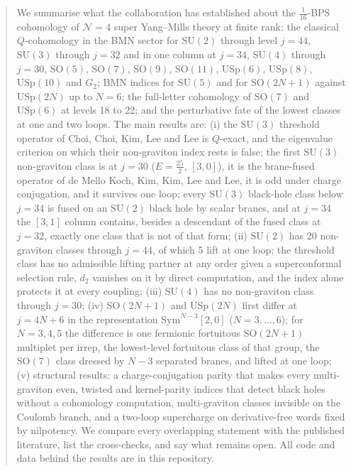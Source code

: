 \documentclass[11pt]{article}
\newcommand{\SU}{\mathrm{SU}}
\newcommand{\SO}{\mathrm{SO}}
\newcommand{\USp}{\mathrm{USp}}
\newcommand{\Gtwo}{G_2}
\newcommand{\cN}{\mathcal{N}}
\begin{document}
\begin{abstract}
We summarise what the collaboration has established about the $\frac1{16}$-BPS cohomology of $\cN=4$ super
Yang--Mills theory at finite rank: the classical $Q$-cohomology in the BMN sector for $\SU(2)$ through level $j=44$,
$\SU(3)$ through $j=32$ and in one column at $j=34$, $\SU(4)$ through $j=30$, $\SO(5)$, $\SO(7)$, $\SO(9)$,
$\SO(11)$, $\USp(6)$, $\USp(8)$, $\USp(10)$ and $\Gtwo$; BMN indices for $\SU(5)$ and for $\SO(2N+1)$ against
$\USp(2N)$ up to $N=6$; the full-letter cohomology of $\SO(7)$ and $\USp(6)$ at levels 18 to 22; and the
perturbative fate of the lowest classes at one and two loops. The main results are:
(i) the $\SU(3)$ threshold operator of Choi, Choi, Kim, Lee and Lee is $Q$-exact, and the eigenvalue criterion on
which their non-graviton index rests is false; the first $\SU(3)$ non-graviton class is at $j=30$
($E=\tfrac{25}{2}$, $[3,0]$), it is the brane-fused operator of de Mello Koch, Kim, Kim, Lee and Lee, it is odd under
charge conjugation, and it survives one loop; every $\SU(3)$ black-hole class below $j=34$ is fused on an $\SU(2)$
black hole by scalar branes, and at $j=34$ the $[3,1]$ column contains, besides a descendant of the fused class at
$j=32$, exactly one class that is not of that form;
(ii) $\SU(2)$ has 20 non-graviton classes through $j=44$, of which 5 lift at one loop; the threshold class has no
admissible lifting partner at any order given a superconformal selection rule, $d_2$ vanishes on it by direct
computation, and the index alone protects it at every coupling;
(iii) $\SU(4)$ has no non-graviton class through $j=30$;
(iv) $\SO(2N+1)$ and $\USp(2N)$ first differ at $j=4N+6$ in the representation $\mathrm{Sym}^{N-3}[2,0]$ ($N=3,\dots,6$);
for $N=3,4,5$ the difference is one fermionic fortuitous $\SO(2N+1)$ multiplet per irrep, the lowest-level
fortuitous class of that group, the $\SO(7)$ class dressed by $N-3$ separated branes, and lifted at one loop;
(v) structural results: a charge-conjugation parity that makes every multi-graviton even, twisted and kernel-parity
indices that detect black holes without a cohomology computation, multi-graviton classes invisible on the Coulomb
branch, and a two-loop supercharge on derivative-free words fixed by nilpotency.
We compare every overlapping statement with the published literature, list the cross-checks, and say what remains
open. All code and data behind the results are in this repository.
\end{abstract}

\tableofcontents
\end{document}
